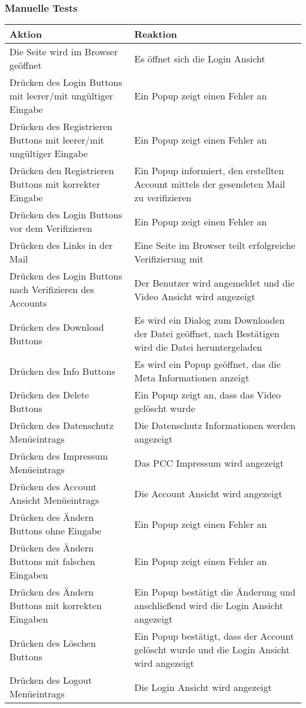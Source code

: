  
\subsubsection{Manuelle Tests}

\begin{longtable}{p{} | p{}}
\hline
\textbf{Aktion} & \textbf{Reaktion}\\
\hline
Die Seite wird im Browser geöffnet & Es öffnet sich die Login Ansicht\\
\hline
Drücken des Login Buttons mit leerer/mit ungültiger Eingabe & Ein Popup zeigt einen Fehler an\\
\hline
Drücken des Registrieren Buttons mit leerer/mit ungültiger Eingabe& Ein Popup zeigt einen Fehler an\\
\hline
Drücken den Registrieren Buttons mit korrekter Eingabe & Ein Popup informiert, den erstellten Account mittels der gesendeten Mail zu verifizieren\\
\hline  
Drücken des Login Buttons vor dem Verifizieren & Ein Popup zeigt einen Fehler an\\
\hline  
Drücken des Links in der Mail & Eine Seite im Browser teilt erfolgreiche Verifizierung mit\\
\hline
Drücken des Login Buttons nach Verifizieren des Accounts & Der Benutzer wird angemeldet und die Video Ansicht wird angezeigt\\
\hline
Drücken des Download Buttons & Es wird ein Dialog zum Downloaden der Datei geöffnet, nach Bestätigen wird die Datei heruntergeladen\\
\hline
Drücken des Info Buttons & Es wird ein Popup geöffnet, das die Meta Informationen anzeigt\\
\hline
Drücken des Delete Buttons & Ein Popup zeigt an, dass das Video gelöscht wurde\\
\hline
Drücken des Datenschutz Menüeintrags & Die Datenschutz Informationen werden angezeigt\\
\hline
Drücken des Impressum Menüeintrags & Das PCC Impressum wird angezeigt\\
\hline
Drücken des Account Ansicht Menüeintrags & Die Account Ansicht wird angezeigt\\
\hline
Drücken des Ändern Buttons ohne Eingabe & Ein Popup zeigt einen Fehler an\\
\hline
Drücken des Ändern Buttons mit falschen Eingaben & Ein Popup zeigt einen Fehler an\\
\hline
Drücken des Ändern Buttons mit korrekten Eingaben & Ein Popup bestätigt die Änderung und anschließend wird die Login Ansicht angezeigt\\
\hline
Drücken des Löschen Buttons & Ein Popup bestätigt, dass der Account gelöscht wurde und die Login Ansicht wird angezeigt\\
\hline
Drücken des Logout Menüeintrags & Die Login Ansicht wird angezeigt\\
\hline

 \end{longtable}
